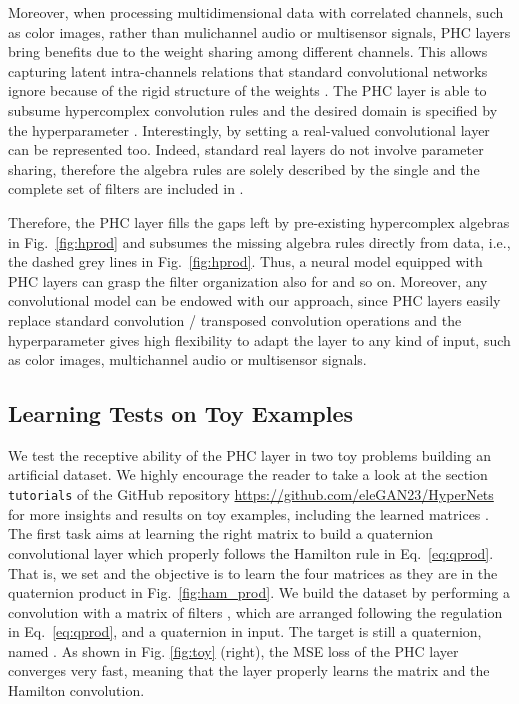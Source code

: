 \documentclass[lettersize,journal]{IEEEtran}
\begin{document}
Moreover, when processing multidimensional data with correlated channels, such as color images, rather than mulichannel audio or multisensor signals, PHC layers bring benefits due to the weight sharing among different channels. This allows capturing latent intra-channels relations that standard convolutional networks ignore because of the rigid structure of the weights \cite{GrassucciQGAN2021, ParcolletICASSP2019a}. The PHC layer is able to subsume hypercomplex convolution rules and the desired domain is specified by the hyperparameter .
Interestingly, by setting  a real-valued convolutional layer can be represented too. Indeed, standard real layers do not involve parameter sharing, therefore the algebra rules are solely described by the single  and the complete set of filters are included in .

Therefore, the PHC layer fills the gaps left by pre-existing hypercomplex algebras in Fig.~\ref{fig:hprod} and subsumes the missing algebra rules directly from data, i.e., the dashed grey lines in Fig.~\ref{fig:hprod}. Thus, a neural model equipped with PHC layers can grasp the filter organization also for  and so on.
Moreover, any convolutional model can be endowed with our approach, since PHC layers easily replace standard convolution / transposed convolution operations and the hyperparameter  gives high flexibility to adapt the layer to any kind of input, such as color images, multichannel audio or multisensor signals. 
\subsection{Learning Tests on Toy Examples}

We test the receptive ability of the PHC layer in two toy problems building an artificial dataset. We highly encourage the reader to take a look at the section \texttt{tutorials} of the GitHub repository \url{https://github.com/eleGAN23/HyperNets} for more insights and results on toy examples, including the learned matrices . The first task aims at learning the right matrix   to build a quaternion convolutional layer which properly follows the Hamilton rule in Eq.~\ref{eq:qprod}. That is, we set  and the objective is to learn the four matrices  as they are in the quaternion product in Fig.~\ref{fig:ham_prod}. We build the dataset by performing a convolution with a matrix of filters , which are arranged following the regulation in Eq.~\ref{eq:qprod}, and a quaternion  in input. The target is still a quaternion, named . As shown in Fig. \ref{fig:toy} (right), the MSE loss of the PHC layer converges very fast, meaning that the layer properly learns the matrix  and the Hamilton convolution. 
\end{document}
